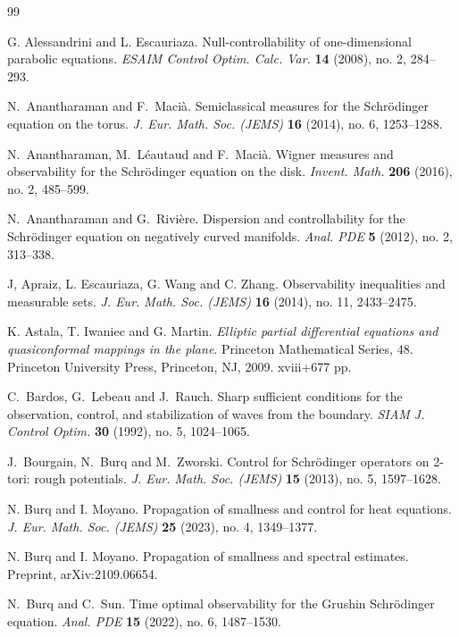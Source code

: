 \documentclass[a4paper,reqno]{amsart}
\theoremstyle{definition}
\numberwithin{equation}{section}
\begin{document}
\begin{thebibliography}{99}
	

G. Alessandrini and L. Escauriaza.
Null-controllability of one-dimensional parabolic equations. 
\emph{ESAIM Control Optim. Calc. Var.} \textbf{14} (2008), no. 2, 284–293. 		
	
		N.~Anantharaman and F.~Maci\`a.
   Semiclassical measures for the Schr\"odinger equation on the torus. 
   {\emph{J. Eur. Math. Soc. (JEMS)}} {\textbf{16}} (2014), no. 6, 1253–1288.
  
	N.~Anantharaman, M.~L\'eautaud and F.~Maci\`a. 
  Wigner measures and observability for the Schrödinger equation on the disk.
	{\emph{Invent. Math.}} {\textbf{206}} (2016), no. 2, 485–599. 
 
	N.~Anantharaman and  G.~Rivière. 
 Dispersion and controllability for the Schr\"odinger equation on negatively curved manifolds.
 	{\emph{Anal. PDE}} {\textbf{5}} (2012), no. 2, 313–338.	
	
  J, Apraiz, L. Escauriaza, G. Wang and C. Zhang. 
  Observability inequalities and measurable sets. 
  \emph{J. Eur. Math. Soc. (JEMS)} {\textbf{16}} (2014), no. 11, 2433–2475.
 
  K. Astala, T. Iwaniec and G. Martin.
  \emph{Elliptic partial differential equations and quasiconformal mappings in the plane}. Princeton Mathematical Series, 48. Princeton University Press, Princeton, NJ, 2009. xviii+677 pp.		
		
		
		C.~Bardos, G.~Lebeau and J.~Rauch.
  Sharp sufficient conditions for the
			observation, control, and stabilization of waves from the boundary.
   {\emph{SIAM J. Control Optim.}} {\textbf{30}} (1992), no. 5, 1024–1065.		
		
		J.~Bourgain, N.~Burq and M.~Zworski.
  Control for Schr\"odinger operators on 2-tori: rough potentials.
  \emph{J. Eur. Math. Soc. (JEMS)} \textbf{15} (2013), no. 5, 1597–1628.		

N. Burq and I. Moyano.
Propagation of smallness and control for heat equations.
\emph{J. Eur. Math. Soc. (JEMS)} \textbf{25} (2023), no. 4, 1349–1377.

N. Burq and I. Moyano.
Propagation of smallness and spectral estimates.
Preprint, arXiv:2109.06654.

		N.~Burq and C.~Sun.
		Time optimal observability for the Grushin Schr\"odinger equation. 
   \emph{Anal. PDE} \textbf{15} (2022), no. 6, 1487–1530.
   

\end{thebibliography}
\end{document}
